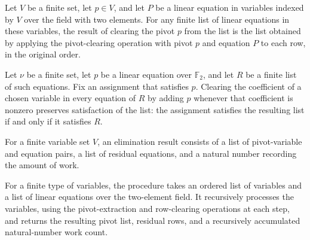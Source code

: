 \begin{definition}
\leanok
{}
Let $V$ be a finite set, let $p\in V$, and let $P$ be a linear equation in variables
indexed by $V$ over the field with two elements. For any finite list of linear equations
in these variables, the result of clearing the pivot $p$ from the list is the list
obtained by applying the pivot-clearing operation with pivot $p$ and equation $P$ to
each row, in the original order.
\end{definition}

\begin{theorem}
\leanok
{}
Let $\nu$ be a finite set, let $p$ be a linear equation over $\mathbb{F}_2$, and let $R$
be a finite list of such equations. Fix an assignment that satisfies $p$. Clearing the
coefficient of a chosen variable in every equation of $R$ by adding $p$ whenever that
coefficient is nonzero preserves satisfaction of the list: the assignment satisfies the
resulting list if and only if it satisfies $R$.
\end{theorem}

\begin{definition}
\leanok
{}
For a finite variable set $V$, an elimination result consists of a list of
pivot-variable and equation pairs, a list of residual equations, and a natural number
recording the amount of work.
\end{definition}

\begin{definition}
\leanok
{}
For a finite type of variables, the procedure takes an ordered list of variables and a
list of linear equations over the two-element field. It recursively processes the
variables, using the pivot-extraction and row-clearing operations at each step, and
returns the resulting pivot list, residual rows, and a recursively accumulated
natural-number work count.
\end{definition}

